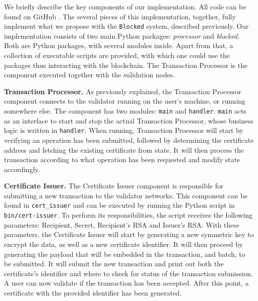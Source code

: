 We briefly describe the key components of our implementation. All code can be found on GitHub \cite{blocked}. The several pieces of this implementation, together, fully implement what we propose with the  \texttt{Blocked} system, described previously. Our implementation consists of two main Python packages: \textit{processor} and \textit{blocked}. Both are Python packages, with several modules inside. Apart from that, a collection of executable scripts are provided, with which one could use the packages thus interacting with the blockchain. The Transaction Processor is the component executed together with the validation nodes.

\textbf{Transaction Processor.} As previously explained, the Transaction Processor component connects to the validator running on the user's machine, or running somewhere else. The component has two modules: \texttt{main} and \texttt{handler}. \texttt{main} acts as an interface to start and stop the actual Transaction Processor, whose business logic is written in \texttt{handler}. When running, Transaction Processor will start by verifying an operation has been submitted, followed by determining the certificate address and fetching the existing certificate from state. It will then process the transaction according to what operation has been requested and modify state accordingly.

\textbf{Certificate Issuer.} The Certificate Issuer component is responsible for submitting a new transaction to the validator networks. This component can be found in \texttt{cert\_issuer} and can be executed by running the Python script in \texttt{bin/cert-issuer}. To perform its responsibilities, the script receives the following parameters: Recipient, Secret, Recipient's RSA and Issuer's RSA. With these parameters, the Certificate Issuer will start by generating a new symmetric key to encrypt the data, as well as a new certificate identifier. It will then proceed by generating the payload that will be embedded in the transaction, and batch, to be submitted. It will submit the new transaction and print out both the certificate's identifier and where to check for status of the transaction submission. A user can now validate if the transaction has been accepted. After this point, a certificate with the provided identifier has been generated.

